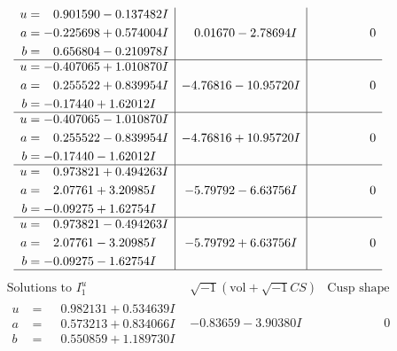 \documentclass[1p]{elsarticle_modified}
\theoremstyle{definition}
\newcommand{\I}{\sqrt{-1}}
\begin{document}
$$\begin{array}{c|c|c}
\begin{aligned}
u &= \phantom{-}0.901590 - 0.137482 I \\
a &= -0.225698 + 0.574004 I \\
b &= \phantom{-}0.656804 - 0.210978 I\end{aligned}
 & \phantom{-}0.01670 - 2.78694 I & \phantom{-0.000000 } 0 \\ \hline\begin{aligned}
u &= -0.407065 + 1.010870 I \\
a &= \phantom{-}0.255522 + 0.839954 I \\
b &= -0.17440 + 1.62012 I\end{aligned}
 & -4.76816 - 10.95720 I & \phantom{-0.000000 } 0 \\ \hline\begin{aligned}
u &= -0.407065 - 1.010870 I \\
a &= \phantom{-}0.255522 - 0.839954 I \\
b &= -0.17440 - 1.62012 I\end{aligned}
 & -4.76816 + 10.95720 I & \phantom{-0.000000 } 0 \\ \hline\begin{aligned}
u &= \phantom{-}0.973821 + 0.494263 I \\
a &= \phantom{-}2.07761 + 3.20985 I \\
b &= -0.09275 + 1.62754 I\end{aligned}
 & -5.79792 - 6.63756 I & \phantom{-0.000000 } 0 \\ \hline\begin{aligned}
u &= \phantom{-}0.973821 - 0.494263 I \\
a &= \phantom{-}2.07761 - 3.20985 I \\
b &= -0.09275 - 1.62754 I\end{aligned}
 & -5.79792 + 6.63756 I & \phantom{-0.000000 } 0\\
 \hline 
 \end{array}$$\newpage$$\begin{array}{c|c|c}  
\text{Solutions to }I^u_{1}& \I (\text{vol} + \sqrt{-1}CS) & \text{Cusp shape}\\
 \hline 
\begin{aligned}
u &= \phantom{-}0.982131 + 0.534639 I \\
a &= \phantom{-}0.573213 + 0.834066 I \\
b &= \phantom{-}0.550859 + 1.189730 I\end{aligned}
 & -0.83659 - 3.90380 I & \phantom{-0.000000 } 0 \\ \hline\begin{aligned}

\end{aligned}
\end{array}$$
\end{document}
